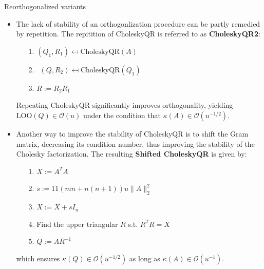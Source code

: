 \documentclass[t,usepdftitle=false]{beamer}
\begin{document}
\begin{frame}{Reorthogonalized variants}
\begin{itemize}
\item The lack of stability of an orthogonlization procedure can be partly remedied by repetition.
The repitition of CholeskyQR is referred to as \textbf{CholeskyQR2}:
\begin{itemize}
\item[1.]$(Q_1,R_1)\mapsfrom\text{CholeskyQR}(A)$\vspace{.1cm}
\item[2.]$\;\,(Q,R_2)\mapsfrom\text{CholeskyQR}(Q_1)$\vspace{.1cm}
\item[3.]$R:=R_2R_1$
\end{itemize}
\item[]Repeating CholeskyQR significantly improves orthogonality, yielding $\text{LOO}(Q)\in\mathcal{O}(u)$ under the condition that $\kappa(A)\in\mathcal{O}(u^{-1/2})$.
\item Another way to improve the stability of CholeskyQR is to shift the Gram matrix, decreasing its condition number, thus improving the stability of the Cholesky factorization.
The resulting \textbf{Shifted CholeskyQR} is given by:
\begin{itemize}
\item[1.]$X:=A^TA$\vspace{.1cm}
\item[2.]$s:=11(mn+n(n+1))u\|A\|_2^2${\color{gray}{ // calculate shift}}\vspace{.1cm}
\item[3.]$X:=X+sI_n${\color{gray}{ // shift Gram matrix}}\vspace{.1cm}
\item[4.]Find the upper triangular $R$ s.t. $R^TR=X$
{\color{gray}{ // Cholesky factorization}}\vspace{.1cm}
\item[5.]$Q:=AR^{-1}${\color{gray}{ // triangular solves}}
\end{itemize}
which ensures $\kappa(Q)\in\mathcal{O}(u^{-1/2})$ as long as $\kappa(A)\in\mathcal{O}(u^{-1})$.
\end{itemize}
\end{frame}
\end{document}
